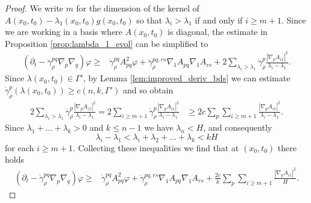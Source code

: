 \documentclass[12pt]{amsart}
\begin{document}
\begin{proof}
We write $m$ for the dimension of the kernel of $A(x_0,t_0) - \lambda_1(x_0,t_0) g(x_0,t_0)$ so that $\lambda_i > \lambda_1$ if and only if $i\geq m+1$. Since we are working in a basis where $A(x_0,t_0)$ is diagonal, the estimate in Proposition \ref{prop:lambda_1_evol} can be simplified to 
\begin{align*}
(\partial_t - \dot \gamma_\rho^{pq} \nabla_p \nabla_q) \varphi \geq& \dot \gamma_\rho^{pq}  A^2_{pq} \varphi  + \ddot \gamma_\rho^{pq,rs} \nabla_1 A_{pq} \nabla_1 A_{rs}+ 2\sum_{\lambda_i > \lambda_1 }  \dot \gamma_\rho^{p}\frac{ |\nabla_p A_{i1}|^2}{\lambda_i - \lambda_1} .
\end{align*}
Since $\lambda(x_0,t_0) \in \Gamma'$, by Lemma \ref{lem:improved_deriv_bds} we can estimate $\dot \gamma_\rho^p (\lambda(x_0,t_0)) \geq c(n,k,\Gamma')$ and so obtain
\begin{align*}
2\sum_{\lambda_i > \lambda_1 }  \dot \gamma_\rho^{p}\frac{ |\nabla_p A_{i1}|^2}{\lambda_i - \lambda_1} =2\sum_{i\geq m+1 }  \dot \gamma_\rho^{p}\frac{ |\nabla_p A_{i1}|^2}{\lambda_i - \lambda_1}  &\geq 2c \sum_p \sum_{i \geq m+1 } \frac{|\nabla_p A_{i1}|^2}{\lambda_i - \lambda_1} .
\end{align*}
Since $\lambda_1 + \dots + \lambda_k >0$ and $k \leq n-1$ we have $\lambda_n < H$, and consequently
\[\lambda_i - \lambda_1 < \lambda_i +\lambda_2+ \dots + \lambda_k < kH\]
for each $i \geq m+1$. Collecting these inequalities we find that at $(x_0,t_0)$ there holds
\begin{align*}
(\partial_t - \dot \gamma_\rho^{pq} \nabla_p \nabla_q) \varphi \geq& \dot \gamma_\rho^{pq} A^2_{pq} \varphi  + \ddot \gamma_\rho^{pq,rs} \nabla_1 A_{pq} \nabla_1 A_{rs}+ \frac{2c}{k} \sum_p \sum_{i \geq m+1 } \frac{|\nabla_p A_{i1}|^2}{H} .
\end{align*}


\end{proof}
\end{document}
